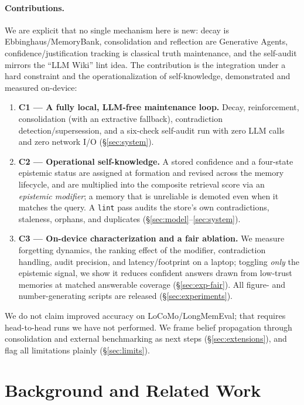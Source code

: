 \documentclass[11pt]{article}
\theoremstyle{definition}
\newcommand{\code}[1]{\texttt{#1}}
\begin{document}
\paragraph{Contributions.}
We are explicit that no single mechanism here is new: decay is
Ebbinghaus/MemoryBank, consolidation and reflection are Generative Agents,
confidence/justification tracking is classical truth maintenance, and the
self-audit mirrors the ``LLM Wiki'' lint idea. The contribution is the
integration under a hard constraint and the operationalization of
self-knowledge, demonstrated and measured on-device:
\begin{enumerate}[leftmargin=1.4em]
  \item \textbf{C1 --- A fully local, LLM-free maintenance loop.} Decay,
  reinforcement, consolidation (with an extractive fallback), contradiction
  detection/supersession, and a six-check self-audit run with zero LLM calls and
  zero network I/O (\S\ref{sec:system}).
  \item \textbf{C2 --- Operational self-knowledge.} A stored confidence and a
  four-state epistemic status are assigned at formation and revised across the
  memory lifecycle, and are multiplied into the composite retrieval score via an
  \emph{epistemic modifier}; a memory that is unreliable is demoted even when it
  matches the query. A \code{lint} pass audits the store's own contradictions,
  staleness, orphans, and duplicates (\S\ref{sec:model}--\ref{sec:system}).
  \item \textbf{C3 --- On-device characterization and a fair ablation.} We
  measure forgetting dynamics, the ranking effect of the modifier, contradiction
  handling, audit precision, and latency/footprint on a laptop; toggling
  \emph{only} the epistemic signal, we show it reduces confident answers drawn from
  low-trust memories at matched answerable coverage (\S\ref{sec:exp-fair}). All
  figure- and number-generating scripts are released (\S\ref{sec:experiments}).
\end{enumerate}
We do not claim improved accuracy on LoCoMo/LongMemEval; that requires
head-to-head runs we have not performed. We frame belief propagation
through consolidation and external benchmarking as next steps
(\S\ref{sec:extensions}), and flag all limitations plainly (\S\ref{sec:limits}).

\section{Background and Related Work}\label{sec:related}
\end{document}
